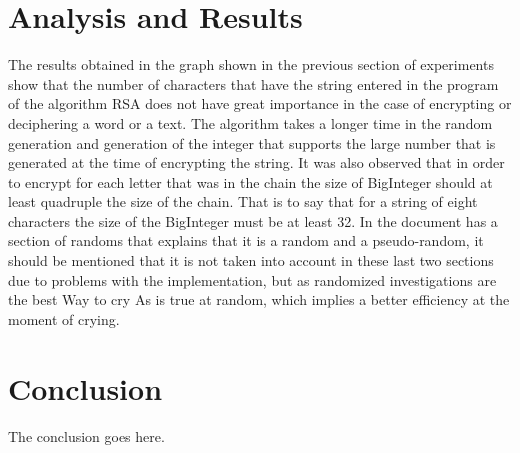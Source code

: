 \documentclass[conference,compsoc, 10pt]{IEEEtran}
\begin{document}
\section{Analysis and Results}
The results obtained in the graph shown in the previous section of experiments show that the number of characters that have the string entered in the program of the algorithm RSA does not have great importance in the case of encrypting or deciphering a word or a text. The algorithm takes a longer time in the random generation and generation of the integer that supports the large number that is generated at the time of encrypting the string.\newline
It was also observed that in order to encrypt for each letter that was in the chain the size of BigInteger should at least quadruple the size of the chain. That is to say that for a string of eight characters the size of the BigInteger must be at least 32.\newline
In the document has a section of randoms that explains that it is a random and a pseudo-random, it should be mentioned that it is not taken into account in these last two sections due to problems with the implementation, but as randomized investigations are the best Way to cry As is true at random, which implies a better efficiency at the moment of crying.

\section{Conclusion}
The conclusion goes here.
\end{document}
